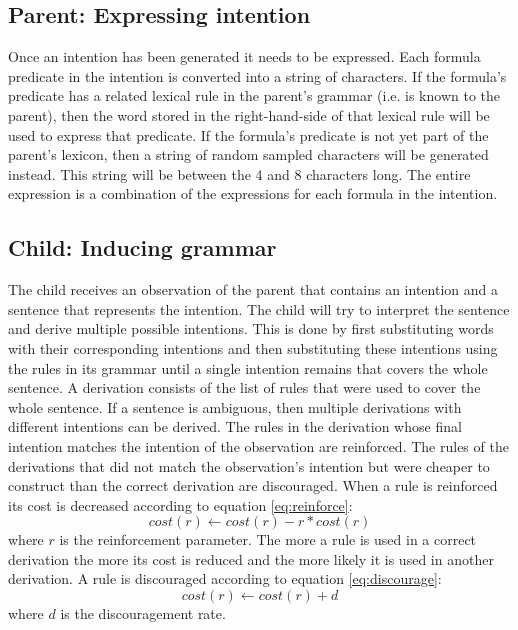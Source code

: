 \documentclass[a4paper]{article}
\begin{document}
\subsection{Parent: Expressing intention}
Once an intention has been generated it needs to be expressed. Each formula predicate in the intention is converted into a string of characters. If the formula's predicate has a related lexical rule in the parent's grammar (i.e. is known to the parent), then the word stored in the right-hand-side of that lexical rule will be used to express that predicate. If the formula's predicate is not yet part of the parent's lexicon, then a string of random sampled characters will be generated instead. This string will be between the 4 and 8 characters long. The entire expression is a combination of the expressions for each formula in the intention.

\subsection{Child: Inducing grammar} %
The child receives an observation of the parent that contains an intention and a sentence that represents the intention. The child will try to interpret the sentence and derive multiple possible intentions. This is done by first substituting words with their corresponding intentions and then substituting these intentions using the rules in its grammar until a single intention remains that covers the whole sentence. A derivation consists of the list of rules that were used to cover the whole sentence. If a sentence is ambiguous, then multiple derivations with different intentions can be derived. The rules in the derivation whose final intention matches the intention of the observation are reinforced. The rules of the derivations that did not match the observation's intention but were cheaper to construct than the correct derivation are discouraged. When a rule is reinforced its cost is decreased according to equation \ref{eq:reinforce}:
\begin{equation}
cost(r) \leftarrow cost(r) - r*cost(r)
\label{eq:reinforce}
\end{equation}
where $r$ is the reinforcement parameter. The more a rule is used in a correct derivation the more its cost is reduced and the more likely it is used in another derivation. A rule is discouraged according to equation \ref{eq:discourage}:
\begin{equation}
cost(r) \leftarrow cost(r) + d
\label{eq:discourage}
\end{equation}
where $d$ is the discouragement rate.
\end{document}
